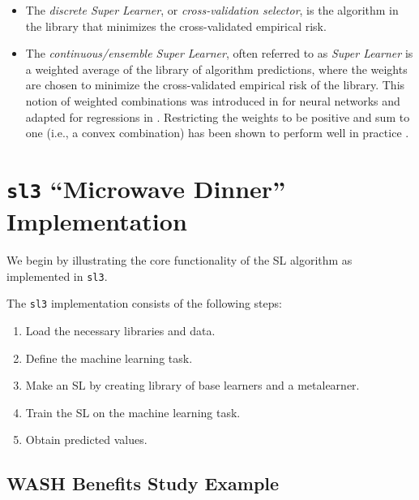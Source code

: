 \documentclass[12pt, krantz2,]{krantz}
\newcommand{\passthrough}[1]{#1}
\providecommand{\tightlist}{%
  \setlength{\itemsep}{0pt}\setlength{\parskip}{0pt}}
\theoremstyle{definition}
\theoremstyle{definition}
\theoremstyle{definition}
\newcommand{\1}{\mathbbm{1}}
\begin{document}
\begin{itemize}
  \begin{itemize}
  \tightlist
  \item
    The \emph{discrete Super Learner}, or \emph{cross-validation selector}, is the
    algorithm in the library that minimizes the cross-validated empirical
    risk.
  \item
    The \emph{continuous/ensemble Super Learner}, often referred to as
    \emph{Super Learner} is a weighted average of the library of algorithm
    predictions, where the weights are chosen to minimize the cross-validated
    empirical risk of the library. This notion of weighted combinations was
    introduced in \citet{wolpert1992stacked} for neural networks and adapted for
    regressions in \citet{breiman1996stacked}. Restricting the weights to be positive
    and sum to one (i.e., a convex combination) has been shown to perform well
    in practice \citep{polley2010super, vdl2007super}.
  \end{itemize}
\end{itemize}

\hypertarget{sl3-microwave-dinner-implementation}{%
\section{\texorpdfstring{\texttt{sl3} ``Microwave Dinner'' Implementation}{sl3 ``Microwave Dinner'' Implementation}}\label{sl3-microwave-dinner-implementation}}

We begin by illustrating the core functionality of the SL algorithm as
implemented in \passthrough{\lstinline!sl3!}.

The \passthrough{\lstinline!sl3!} implementation consists of the following steps:

\begin{enumerate}
\def\labelenumi{\arabic{enumi}.}
\setcounter{enumi}{-1}
\tightlist
\item
  Load the necessary libraries and data.
\item
  Define the machine learning task.
\item
  Make an SL by creating library of base learners and a metalearner.
\item
  Train the SL on the machine learning task.
\item
  Obtain predicted values.
\end{enumerate}

\hypertarget{wash-benefits-study-example-1}{%
\subsection*{WASH Benefits Study Example}\label{wash-benefits-study-example-1}}
\end{document}
